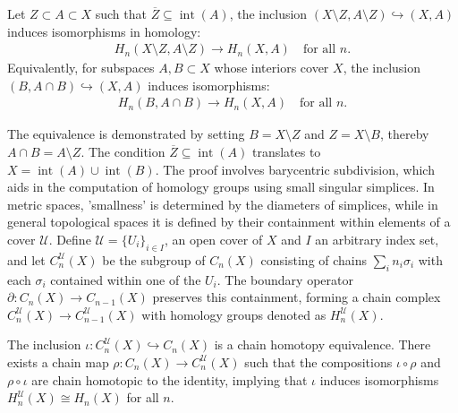 \begin{theorem}[Excision]
	{\cite[Theorem 2.20]{hatcher2005algebraic}
	\label{excisiontheorem}
	Let $Z \subset A \subset X$ such that $\overline{Z}\subseteq \operatorname{int}(A)$, the inclusion $(X\setminus Z, A\setminus Z) \hookrightarrow (X, A)$ induces isomorphisms in homology}:
	\begin{align}
		H_{n}(X\setminus Z, A\setminus Z) \to H_{n}(X, A) \quad \text{for all }n. 
	\end{align}
	Equivalently, for subspaces $A, B \subset X$ whose interiors cover $X$, the
	inclusion $(B, A \cap B) \hookrightarrow (X, A)$ induces isomorphisms:
	\begin{align}
		H_{n}(B, A \cap B) \to H_{n}(X, A) \quad \text{for all }n. 
	\end{align}
\end{theorem}

The equivalence is demonstrated by setting \( B = X \setminus Z \) and \( Z = X \setminus B \), thereby \( A \cap B = A \setminus Z \). The condition \( \overline{Z} \subseteq \operatorname{int}(A) \) translates to \( X = \operatorname{int}(A) \cup \operatorname{int}(B) \). The proof involves barycentric subdivision, which aids in the computation of homology groups using small singular simplices. In metric spaces, 'smallness' is determined by the diameters of simplices, while in general topological spaces it is defined by their containment within elements of a cover \( \mathcal{U} \). Define \( \mathcal{U} = \{U_{i}\}_{i \in I} \), an open cover of \( X \) and $I$ an arbitrary index set, and let \( C^{\mathcal{U}}_{n}(X) \) be the subgroup of \( C_{n}(X) \) consisting of chains \( \sum_{i} n_{i} \sigma_{i} \) with each \( \sigma_{i} \) contained within one of the \( U_{i} \). The boundary operator \( \partial: C_{n}(X) \to C_{n-1}(X) \) preserves this containment, forming a chain complex \( C^{\mathcal{U}}_{n}(X) \to C^{\mathcal{U}}_{n-1}(X) \) with homology groups denoted as \( H^{\mathcal{U}}_{n}(X) \).

\begin{proposition}{\cite[Proposition 2.21]{hatcher2005algebraic}}
	\label{baryproof}
	The inclusion \( \iota : C^{\mathcal{U}}_n(X) \hookrightarrow C_n(X) \) is a chain homotopy equivalence. There exists a chain map \( \rho : C_n(X) \to C^{\mathcal{U}}_n(X) \) such that the compositions \( \iota \circ \rho \) and \( \rho \circ \iota \) are chain homotopic to the identity, implying that \( \iota \) induces isomorphisms \( H^{\mathcal{U}}_n(X) \cong H_n(X) \) for all \( n \).
\end{proposition}

